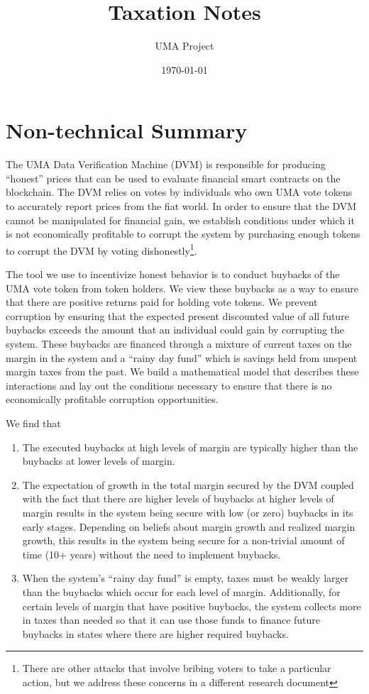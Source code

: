 \documentclass[12pt]{article}
\title{Taxation Notes}
\author{UMA Project}
\date{\today}
\begin{document}
\maketitle

\clearpage
\newpage


\section{Non-technical Summary}

  The UMA Data Verification Machine (DVM) is responsible for producing ``honest'' prices that can be
  used to evaluate financial smart contracts on the blockchain. The DVM relies on votes by
  individuals who own UMA vote tokens to accurately report prices from the fiat world. In order to
  ensure that the DVM cannot be manipulated for financial gain, we establish conditions under which
  it is not economically profitable to corrupt the system by purchasing enough tokens to corrupt the
  DVM by voting dishonestly\footnote{There are other attacks that involve bribing voters to take a
  particular action, but we address these concerns in a different research document}.

  The tool we use to incentivize honest behavior is to conduct buybacks of the UMA vote token from
  token holders.  We view these buybacks as a way to ensure that there are positive returns paid for
  holding vote tokens. We prevent corruption by ensuring that the expected present discounted value
  of all future buybacks exceeds the amount that an individual could gain by corrupting the system.
  These buybacks are financed through a mixture of current taxes on the margin in the system and a
  ``rainy day fund'' which is savings held from unspent margin taxes from the past. We build a
  mathematical model that describes these interactions and lay out the conditions necessary to
  ensure that there is no economically profitable corruption opportunities.

  We find that

  \begin{enumerate}
    \item The executed buybacks at high levels of margin are typically higher than the buybacks at
          lower levels of margin.
    \item The expectation of growth in the total margin secured by the DVM coupled with the fact
          that there are higher levels of buybacks at higher levels of margin results in the system
          being secure with low (or zero) buybacks in its early stages. Depending on beliefs about
          margin growth and realized margin growth, this results in the system being secure for a
          non-trivial amount of time (10+ years) without the need to implement buybacks.
    \item When the system's ``rainy day fund'' is empty, taxes must be weakly larger than the
          buybacks which occur for each level of margin. Additionally, for certain levels of margin
          that have positive buybacks, the system collects more in taxes than needed so that it can
          use those funds to finance future buybacks in states where there are higher required
          buybacks.
  \end{enumerate}
\end{document}
